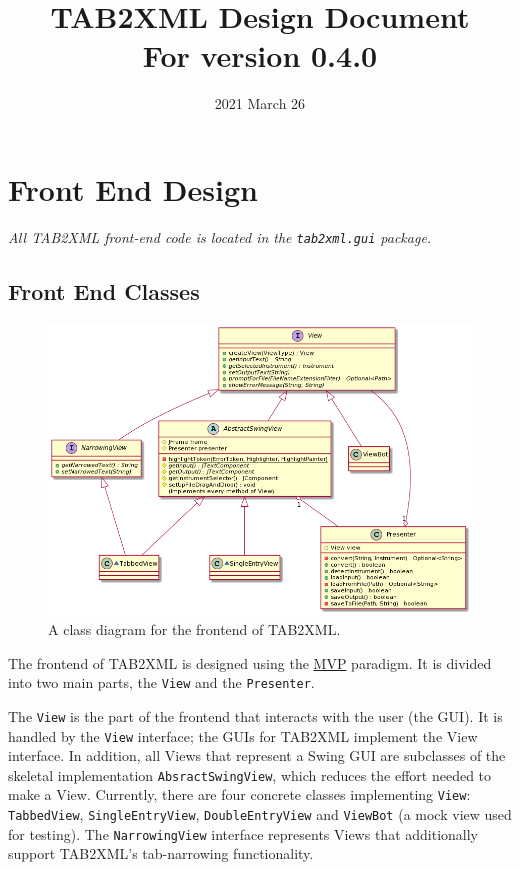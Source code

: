 \documentclass[11pt]{article}
\date{2021 March 26}
\title{TAB2XML Design Document\\\medskip
\large For version 0.4.0}
\begin{document}
\maketitle
\tableofcontents

\newpage

\section{Front End Design}
\label{sec:orgfdbdaad}
\emph{All TAB2XML front-end code is located in the \texttt{tab2xml.gui} package.}
\subsection{Front End Classes}
\label{sec:org1bac85b}
\begin{figure}[htbp]
\centering
\includegraphics[width=.9\linewidth]{./Diagrams/frontend-class-diagram.png}
\caption{A class diagram for the frontend of TAB2XML.}
\end{figure}

The frontend of TAB2XML is designed using the \href{https://en.wikipedia.org/wiki/Model\%E2\%80\%93view\%E2\%80\%93presenter}{MVP} paradigm.  It is divided into two main parts, the \texttt{View} and the \texttt{Presenter}.

The \texttt{View} is the part of the frontend that interacts with the user (the GUI).  It is handled by the \texttt{View} interface; the GUIs for TAB2XML implement the View interface.  In addition, all Views that represent a Swing GUI are subclasses of the skeletal implementation \texttt{AbsractSwingView}, which reduces the effort needed to make a View.  Currently, there are four concrete classes implementing \texttt{View}: \texttt{TabbedView}, \texttt{SingleEntryView}, \texttt{DoubleEntryView} and \texttt{ViewBot} (a mock view used for testing).  The \texttt{NarrowingView} interface represents Views that additionally support TAB2XML's tab-narrowing functionality.
\end{document}
